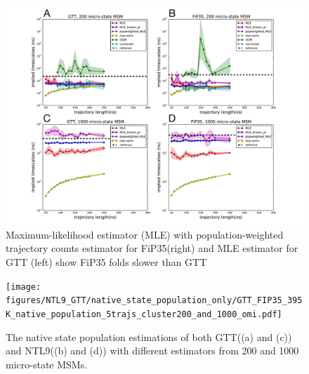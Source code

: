 \documentclass[%
 aip,
rsi,%
 amsmath,amssymb,
 reprint,%
]{revtex4-1}
\begin{document}
\begin{figure}
\includegraphics[width=0.8\paperwidth]{figures/Slowest_timescales_only/GTT_FiP35_ipt.pdf}%
\caption{Maximum-likelihood estimator (MLE) with population-weighted trajectory counts estimator for FiP35(right) and MLE estimator for GTT (left) show FiP35 folds slower than GTT}
\end{figure}

\begin{figure}
\texttt{[image: figures/NTL9\_GTT/native\_state\_population\_only/GTT\_FIP35\_395K\_native\_population\_5trajs\_cluster200\_and\_1000\_omi.pdf]}%
\caption{The native state population estimations of both GTT((a) and (c)) and NTL9((b) and (d)) with different estimators from 200 and 1000 micro-state MSMs.}
\end{figure}
\end{document}
